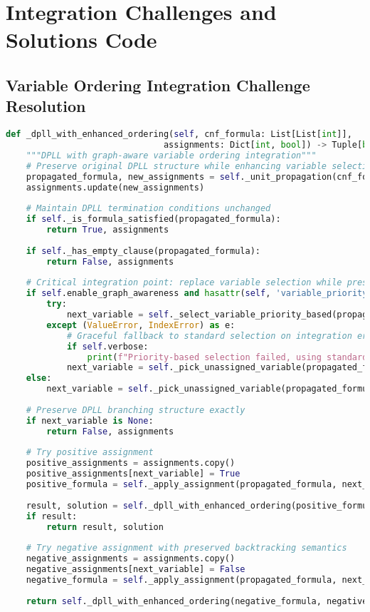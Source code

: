 \section{Integration Challenges and Solutions Code}

\subsection{Variable Ordering Integration Challenge Resolution}
\label{appendix:variable-ordering-integration}

\begin{lstlisting}[language=Python, caption=Variable Ordering Integration Challenge Resolution]
def _dpll_with_enhanced_ordering(self, cnf_formula: List[List[int]], 
                               assignments: Dict[int, bool]) -> Tuple[bool, Dict[int, bool]]:
    """DPLL with graph-aware variable ordering integration"""
    # Preserve original DPLL structure while enhancing variable selection
    propagated_formula, new_assignments = self._unit_propagation(cnf_formula, assignments.copy())
    assignments.update(new_assignments)
    
    # Maintain DPLL termination conditions unchanged
    if self._is_formula_satisfied(propagated_formula):
        return True, assignments
    
    if self._has_empty_clause(propagated_formula):
        return False, assignments
    
    # Critical integration point: replace variable selection while preserving semantics
    if self.enable_graph_awareness and hasattr(self, 'variable_priority_order'):
        try:
            next_variable = self._select_variable_priority_based(propagated_formula, assignments)
        except (ValueError, IndexError) as e:
            # Graceful fallback to standard selection on integration errors
            if self.verbose:
                print(f"Priority-based selection failed, using standard method: {e}")
            next_variable = self._pick_unassigned_variable(propagated_formula, assignments)
    else:
        next_variable = self._pick_unassigned_variable(propagated_formula, assignments)
    
    # Preserve DPLL branching structure exactly
    if next_variable is None:
        return False, assignments
    
    # Try positive assignment
    positive_assignments = assignments.copy()
    positive_assignments[next_variable] = True
    positive_formula = self._apply_assignment(propagated_formula, next_variable, True)
    
    result, solution = self._dpll_with_enhanced_ordering(positive_formula, positive_assignments)
    if result:
        return result, solution
    
    # Try negative assignment with preserved backtracking semantics
    negative_assignments = assignments.copy()
    negative_assignments[next_variable] = False
    negative_formula = self._apply_assignment(propagated_formula, next_variable, False)
    
    return self._dpll_with_enhanced_ordering(negative_formula, negative_assignments)
\end{lstlisting}

